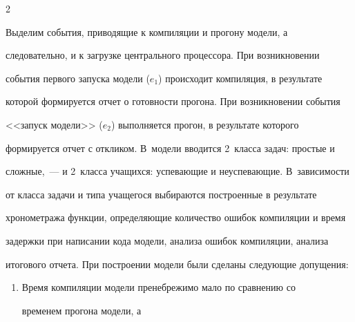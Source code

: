 \begin{multicols}{2}
\vspace*{6pt}

  

  Выделим события, приводящие к компиляции и прогону модели, а 

следовательно, и к загрузке центрального процессора. При возникновении 

события первого запуска модели ($e_1$) происходит компиляция, в результате 

которой формируется отчет о готовности прогона. При возникновении события 

<<запуск модели>> ($e_2$) выполняется прогон, в результате которого 

формируется отчет с откликом. В~модели вводится 2~класса задач: простые и 

сложные,~--- и 2~класса учащихся: успевающие и неуспевающие. В~зависимости 

от класса задачи и типа учащегося выбираются построенные в результате 

хронометража функции, определяющие количество ошибок компиляции и время 

задержки при написании кода модели, анализа ошибок компиляции, анализа 

итогового отчета. При построении модели были сделаны следующие допущения:



\noindent

  \begin{enumerate}[1.]

\item Время компиляции модели пренебрежимо мало по сравнению со 

временем прогона модели, а\linebreak

\end{enumerate}







\end{multicols}



